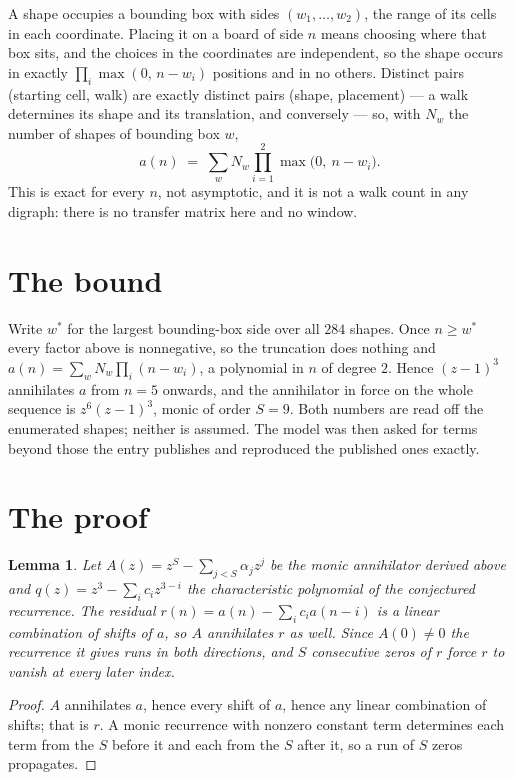 \documentclass[11pt,a4paper]{article}
\theoremstyle{plain}
\newtheorem{lemma}[theorem]{Lemma}
\theoremstyle{definition}
\begin{document}
A shape occupies a bounding box with sides $(w_1,\dots,w_{2})$, the range of its cells in each
coordinate. Placing it on a board of side $n$ means choosing where that box sits, and the
choices in the coordinates are independent, so the shape occurs in exactly
$\prod_{i}\max(0,\,n-w_i)$ positions and in no others. Distinct pairs (starting cell,
walk) are exactly distinct pairs (shape, placement) --- a walk determines its shape and its
translation, and conversely --- so, with $N_w$ the number of shapes of bounding box $w$,
\[
a(n)\;=\;\sum_{w} N_w \prod_{i=1}^{2}\max\bigl(0,\ n-w_i\bigr).
\]
This is exact for every $n$, not asymptotic, and it is not a walk count in any digraph: there is
no transfer matrix here and no window.

\section{The bound}

Write $w^\ast$ for the largest bounding-box side over all $284$ shapes. Once $n\ge w^\ast$
every factor above is nonnegative, so the truncation does nothing and
$a(n)=\sum_w N_w\prod_i(n-w_i)$, a polynomial in $n$ of degree $2$. Hence $(z-1)^{3}$
annihilates $a$ from $n=5$ onwards, and the annihilator in force on the whole sequence is
$z^{6}(z-1)^{3}$, monic of order $S=9$. Both numbers are read off the enumerated
shapes; neither is assumed. The model was then asked for terms beyond those the entry publishes
and reproduced the published ones exactly.

\section{The proof}

\begin{lemma}\label{lem:crit}
Let $A(z)=z^S-\sum_{j<S}\alpha_jz^{j}$ be the monic annihilator derived above and
$q(z)=z^{3}-\sum_ic_iz^{3-i}$ the characteristic polynomial of the conjectured
recurrence. The residual $r(n)=a(n)-\sum_ic_ia(n-i)$ is a linear combination of shifts of $a$,
so $A$ annihilates $r$ as well. Since $A(0)\ne0$ the recurrence it gives runs in both
directions, and $S$ consecutive zeros of $r$ force $r$ to vanish at every later index.
\end{lemma}

\begin{proof}
$A$ annihilates $a$, hence every shift of $a$, hence any linear combination of shifts; that is
$r$. A monic recurrence with nonzero constant term determines each term from the $S$ before it
and each from the $S$ after it, so a run of $S$ zeros propagates.
\end{proof}
\end{document}
